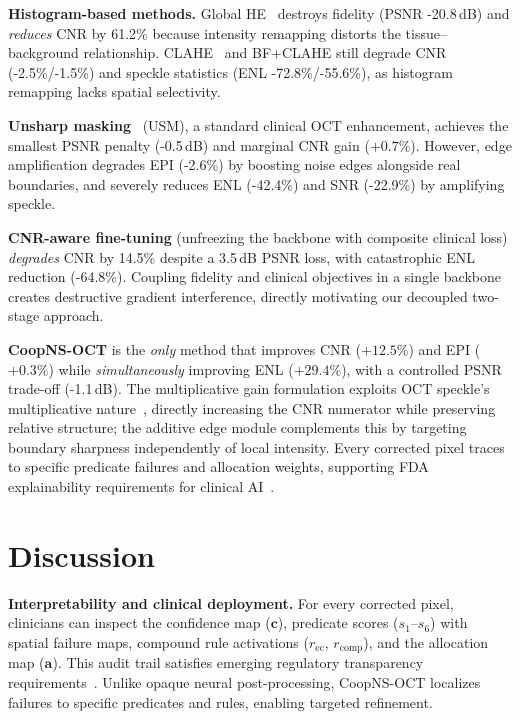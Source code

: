 \documentclass[journal,twoside,web]{ieeecolor}
\begin{document}
\textbf{Histogram-based methods.} Global HE~\cite{gonzalez2018digital} destroys fidelity (PSNR -20.8\,dB) and \emph{reduces} CNR by 61.2\% because intensity remapping distorts the tissue--background relationship. CLAHE~\cite{zuiderveld1994clahe} and BF+CLAHE still degrade CNR (-2.5\%/-1.5\%) and speckle statistics (ENL -72.8\%/-55.6\%), as histogram remapping lacks spatial selectivity.

\textbf{Unsharp masking}~\cite{polesel2000image} (USM), a standard clinical OCT enhancement, achieves the smallest PSNR penalty (-0.5\,dB) and marginal CNR gain ($+0.7\%$). However, edge amplification degrades EPI (-2.6\%) by boosting noise edges alongside real boundaries, and severely reduces ENL (-42.4\%) and SNR (-22.9\%) by amplifying speckle.

\textbf{CNR-aware fine-tuning} (unfreezing the backbone with composite clinical loss) \emph{degrades} CNR by 14.5\% despite a 3.5\,dB PSNR loss, with catastrophic ENL reduction (-64.8\%). Coupling fidelity and clinical objectives in a single backbone creates destructive gradient interference, directly motivating our decoupled two-stage approach.

\textbf{CoopNS-OCT} is the \emph{only} method that improves CNR ($+12.5\%$) and EPI ($+0.3\%$) while \emph{simultaneously} improving ENL ($+29.4\%$), with a controlled PSNR trade-off (-1.1\,dB). The multiplicative gain formulation exploits OCT speckle's multiplicative nature~\cite{goodman2007speckle}, directly increasing the CNR numerator while preserving relative structure; the additive edge module complements this by targeting boundary sharpness independently of local intensity. Every corrected pixel traces to specific predicate failures and allocation weights, supporting FDA explainability requirements for clinical AI~\cite{fdaaiml2021}.

\section{Discussion}
\label{sec:discussion}

\textbf{Interpretability and clinical deployment.}
For every corrected pixel, clinicians can inspect the confidence map ($\mathbf{c}$), predicate scores ($s_1$--$s_6$) with spatial failure maps, compound rule activations ($r_\text{ec}$, $r_\text{comp}$), and the allocation map ($\mathbf{a}$). This audit trail satisfies emerging regulatory transparency requirements~\cite{fdaaiml2021}. Unlike opaque neural post-processing, CoopNS-OCT localizes failures to specific predicates and rules, enabling targeted refinement.
\end{document}
